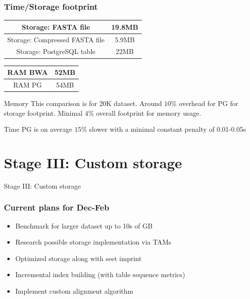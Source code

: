 \begin{frame}
  \frametitle{Time/Storage footprint}
  \begin{tabular}{ |c|c| } 
  \hline
  Storage: FASTA file & 19.8MB \\ 
  \hline
  Storage: Compressed FASTA file & 5.9MB \\ 
  \hline
  Storage: PostgreSQL table & 22MB \\ 
  \hline
  \end{tabular} \newline

  \begin{tabular}{ |c|c| } 
  \hline
  RAM BWA & 52MB \\ 
  \hline
  RAM PG & 54MB \\ 
  \hline
  \end{tabular} \newline

  \begin{exampleblock}{Memory}
  This comparison is for 20K dataset. Around $10\%$ overhead for PG for storage footprint.
  Minimal $4\%$ overall footprint for memory usage.
  \end{exampleblock}
  \begin{exampleblock}{Time}
  PG is on average $15\%$ slower with a minimal constant penalty of 0.01-0.05s
  \end{exampleblock}
\end{frame}


\section{Stage III: Custom storage}
\begin{frame}[plain,c]
\begin{center}
\Huge Stage III: Custom storage
\end{center}
\end{frame}

\begin{frame}
  \frametitle{Current plans for Dec-Feb}
  \begin{itemize}
    \item Benchmark for larger dataset up to 10s of GB
    \item Research possible storage implementation via TAMs
    \item Optimized storage along with seet imprint
    \item Incremental index building (with table sequence metrics)
    \item Implement custom alignment algorithm
  \end{itemize}
\end{frame}
